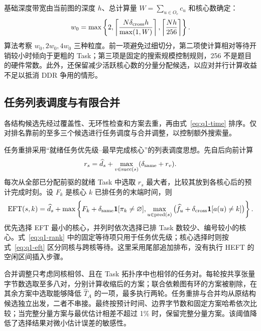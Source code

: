 基础深度带宽由当前图的深度 $h$、总计算量 $W=\sum_{u\in O_c}c_u$ 和核心数确定：
\begin{equation}
w_0=\max\left\{2,\left\lceil\frac{N\delta_{\rm cross}h}{\max(1,W)}\right\rceil,
\left\lceil\frac{Nh}{256}\right\rceil\right\}.
\label{eq:q1-band}
\end{equation}
算法考察 $w_0,2w_0,4w_0$ 三种粒度。前一项避免过细切分，第二项使计算相对等待开销较小时倾向于更粗的 Task；第三项是固定的搜索规模控制规则，256 不是题目的硬件常数。此外，还保留减少活跃核心数的分量分配候选，以应对并行计算收益不足以抵消 DDR 争用的情形。

\subsection{任务列表调度与有限合并}
各结构候选先经过覆盖性、无环性检查和方案去重，再由式~\eqref{eq:q1-time} 排序。仅对排名靠前的至多三个候选进行任务调度与合并调整，以控制额外搜索量。

任务重排采用“就绪任务优先级--最早完成核心”的列表调度思想\cite{Topcuoglu2002}。先自后向前计算
\begin{equation}
r_s=\widehat d_s+\max_{v\in\operatorname{succ}(s)}(\delta_{\rm same}+r_v).
\label{eq:q1-rank}
\end{equation}
每次从全部已分配前驱的就绪 Task 中选取 $r_s$ 最大者，比较其放到各核心后的预计完成时刻。设 $F_k$ 是核心 $k$ 已排任务的末端时间，则
\begin{equation}
\operatorname{EFT}(s,k)=\widehat d_s+
\max\left\{F_k+\delta_{\rm same}\mathbf1[\pi_k\ne\varnothing],
\max_{u\in\operatorname{pred}(s)}
\big(\widehat f_u+\delta_{\rm cross}\mathbf1[a(u)\ne k]\big)\right\}.
\label{eq:q1-eft}
\end{equation}
优先选择 EFT 最小的核心，并列时依次选择已排 Task 数较少、编号较小的核心。式~\eqref{eq:q1-rank} 中的固定等待项只用于任务优先级；核心选择时则按式~\eqref{eq:q1-eft} 区分同核与跨核等待。这里采用尾部追加排布，没有执行 HEFT 的空闲区间插入步骤。

合并调整只考虑同核相邻、且在 Task 拓扑序中也相邻的任务对。每轮按共享张量字节数选取至多八对，分别计算收缩后的方案；联合依赖图有环的方案被剔除，在其余方案中选取能够降低 $\widehat T_A$ 的一项，最多执行两轮。任务重排与合并均从原结构候选独立出发，二者不串接。最终按预计时间、边界字节数和固定方案哈希依次比较；当完整分量方案与最优估计相差不超过 1\% 时，保留完整分量方案。该阈值降低了选择结果对微小估计误差的敏感性。

